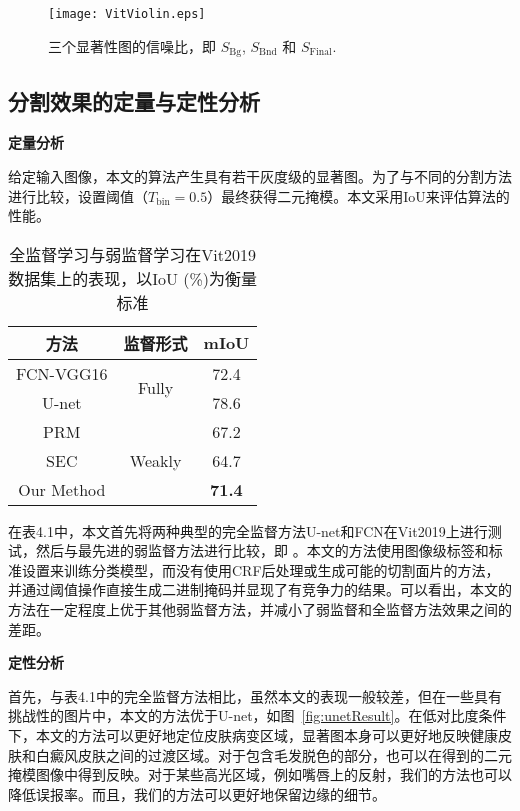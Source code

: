 \begin{figure}[htbp]
\begin{center}
\texttt{[image: VitViolin.eps]}
\end{center}
\caption{三个显著性图的信噪比，即 $S_\mathrm{Bg}$, $S_\mathrm{Bnd}$ 和 $S_\mathrm{Final}$.}
\label{fig:SaliencySNR}
\end{figure}

\subsection{分割效果的定量与定性分析}
\textbf{定量分析}

给定输入图像，本文的算法产生具有若干灰度级的显著图。为了与不同的分割方法进行比较，设置阈值（$ {T_ \mathrm {bin}} = 0.5 $）最终获得二元掩模。本文采用IoU来评估算法的性能。

\begin{table}[tbp]
  \begin{center}
  \caption{全监督学习与弱监督学习在Vit2019数据集上的表现，以IoU (\%)为衡量标准}
    \begin{tabular}{c|c|c}
    \toprule
   方法 & 监督形式 & mIoU \\
    \hline
    \hline
    FCN-VGG16\cite{long2015fully}  & \multirow{2}[2]{*}{Fully} & 72.4 \\
    U-net\cite{ronneberger2015u} &       & 78.6 \\
    \hline
    PRM\cite{Zhou:2018ul}   & \multirow{3}[2]{*}{Weakly} & 67.2 \\
    SEC\cite{Kolesnikov:2016tf}   &       & 64.7 \\
    Our Method &       &\textbf{71.4}\\
    \bottomrule
    \end{tabular}%
\end{center}
  \label{tbl:CompareResult}%
\end{table}%

在表4.1中，本文首先将两种典型的完全监督方法U-net和FCN在Vit2019上进行测试，然后与最先进的弱监督方法进行比较，即 \cite{Zhou:2018ul, Kolesnikov:2016tf}。本文的方法使用图像级标签和标准设置来训练分类模型，而没有使用CRF后处理\cite{Kolesnikov:2016tf}或生成可能的切割面片的方法\cite{Zhou:2018ul}，并通过阈值操作直接生成二进制掩码并显现了有竞争力的结果。可以看出，本文的方法在一定程度上优于其他弱监督方法，并减小了弱监督和全监督方法效果之间的差距。

\textbf{定性分析}

首先，与表4.1中的完全监督方法相比，虽然本文的表现一般较差，但在一些具有挑战性的图片中，本文的方法优于U-net，如图~\ref {fig:unetResult}。在低对比度条件下，本文的方法可以更好地定位皮肤病变区域，显著图本身可以更好地反映健康皮肤和白癜风皮肤之间的过渡区域。对于包含毛发脱色的部分，也可以在得到的二元掩模图像中得到反映。对于某些高光区域，例如嘴唇上的反射，我们的方法也可以降低误报率。而且，我们的方法可以更好地保留边缘的细节。

